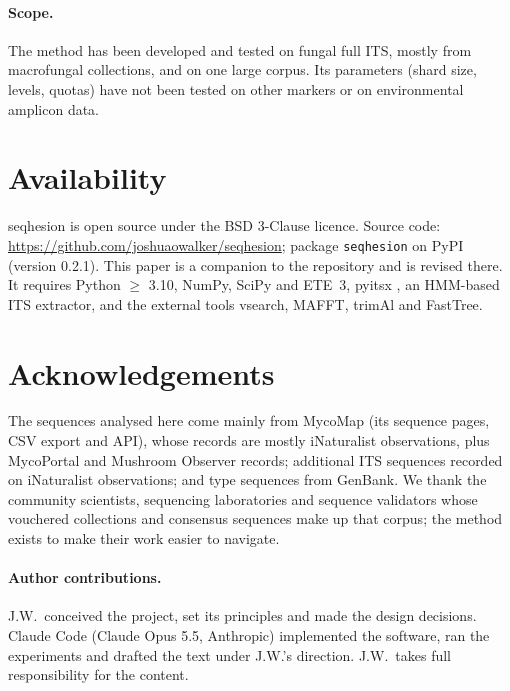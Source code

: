 \documentclass[11pt,a4paper]{article}
\newcommand{\seqhesion}{\textsf{seqhesion}}
\begin{document}
\paragraph{Scope.}
The method has been developed and tested on fungal full ITS, mostly from macrofungal collections,
and on one large corpus. Its parameters (shard size, levels, quotas) have not been tested on other
markers or on environmental amplicon data.

\section{Availability}\label{sec:availability}

\seqhesion{} is open source under the BSD 3-Clause licence. Source code: \url{https://github.com/joshuaowalker/seqhesion}; package \texttt{seqhesion} on PyPI
(version 0.2.1). This paper is a companion to the repository and is revised there.
It requires Python $\ge$ 3.10, NumPy, SciPy and ETE~3, pyitsx \citep{walker2026pyitsx}, an HMM-based ITS extractor, and the external tools vsearch, MAFFT,
trimAl and FastTree.

\section*{Acknowledgements}
The sequences analysed here come mainly from MycoMap (its sequence pages, CSV export and API), whose
records are mostly iNaturalist observations, plus MycoPortal and Mushroom Observer records;
additional ITS sequences recorded on iNaturalist observations; and type sequences from GenBank. We thank the community scientists, sequencing laboratories and
sequence validators whose vouchered collections and consensus sequences make up that corpus; the
method exists to make their work easier to navigate.

\paragraph{Author contributions.} J.W.\ conceived the project, set its principles and made the
design decisions. Claude Code (Claude Opus 5.5, Anthropic) implemented the software, ran the
experiments and drafted the text under J.W.'s direction. J.W.\ takes full responsibility for the
content.

\small
\setlength{\bibsep}{2pt plus 1pt}


\end{document}

